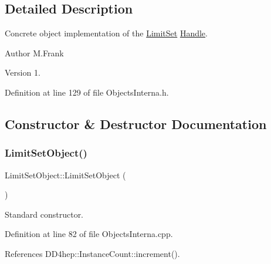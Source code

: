\subsection{Detailed Description}
Concrete object implementation of the \hyperlink{class_d_d4hep_1_1_geometry_1_1_limit_set}{Limit\+Set} \hyperlink{class_d_d4hep_1_1_handle}{Handle}. 

\begin{DoxyAuthor}{Author}
M.\+Frank 
\end{DoxyAuthor}
\begin{DoxyVersion}{Version}
1. 
\end{DoxyVersion}


Definition at line 129 of file Objects\+Interna.\+h.



\subsection{Constructor \& Destructor Documentation}
\hypertarget{class_d_d4hep_1_1_geometry_1_1_limit_set_object_a82ba3444d35470dba78073a03c00a368}{}\label{class_d_d4hep_1_1_geometry_1_1_limit_set_object_a82ba3444d35470dba78073a03c00a368} 
\subsubsection{\texorpdfstring{Limit\+Set\+Object()}{LimitSetObject()}}
{\footnotesize\ttfamily Limit\+Set\+Object\+::\+Limit\+Set\+Object (\begin{DoxyParamCaption}{ }\end{DoxyParamCaption})}



Standard constructor. 



Definition at line 82 of file Objects\+Interna.\+cpp.



References D\+D4hep\+::\+Instance\+Count\+::increment().

\hypertarget{class_d_d4hep_1_1_geometry_1_1_limit_set_object_aa437df9d9fb981ac515d47efb876df1a}{}\label{class_d_d4hep_1_1_geometry_1_1_limit_set_object_aa437df9d9fb981ac515d47efb876df1a} 

